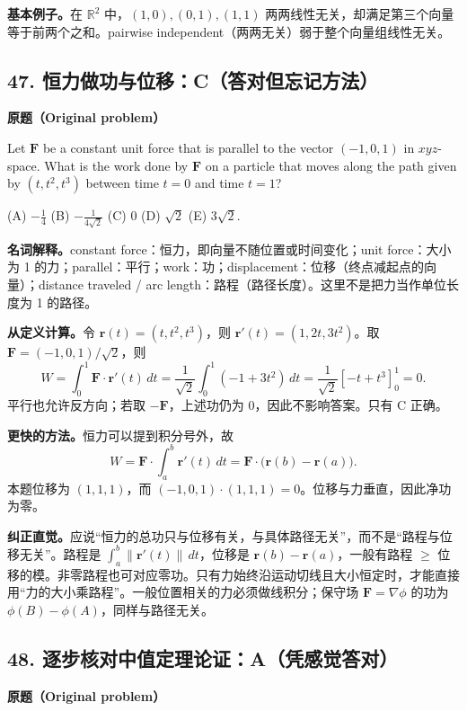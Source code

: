 \documentclass[11pt,a4paper,fontset=fandol]{ctexart}
\begin{document}
\textbf{基本例子。}在 $\mathbb R^2$ 中，$(1,0),(0,1),(1,1)$ 两两线性无关，却满足第三个向量等于前两个之和。pairwise independent（两两无关）弱于整个向量组线性无关。

\subsection{47. 恒力做功与位移：C（答对但忘记方法）}
\label{p2:q47}
\textbf{原题（Original problem）}

Let $\mathbf F$ be a constant unit force that is parallel to the vector $(-1,0,1)$ in $xyz$-space. What is the work done by $\mathbf F$ on a particle that moves along the path given by $(t,t^2,t^3)$ between time $t=0$ and time $t=1$?

(A) $-\frac14$ \quad (B) $-\frac{1}{4\sqrt2}$ \quad (C) $0$ \quad (D) $\sqrt2$ \quad (E) $3\sqrt2$.

\textbf{名词解释。}constant force：恒力，即向量不随位置或时间变化；unit force：大小为 1 的力；parallel：平行；work：功；displacement：位移（终点减起点的向量）；distance traveled / arc length：路程（路径长度）。这里不是把力当作单位长度为 1 的路径。

\textbf{从定义计算。}令 $\mathbf r(t)=(t,t^2,t^3)$，则 $\mathbf r'(t)=(1,2t,3t^2)$。取 $\mathbf F=(-1,0,1)/\sqrt2$，则
\begin{equation}
W=\int_0^1\mathbf F\cdot\mathbf r'(t)\,dt
=\frac1{\sqrt2}\int_0^1(-1+3t^2)\,dt
=\frac1{\sqrt2}[-t+t^3]_0^1=\boxed0.
\label{p2:work-integral}
\end{equation}
平行也允许反方向；若取 $-\mathbf F$，上述功仍为 0，因此不影响答案。只有 C 正确。

\textbf{更快的方法。}恒力可以提到积分号外，故
\begin{equation}
W=\mathbf F\cdot\int_a^b\mathbf r'(t)\,dt
=\mathbf F\cdot\bigl(\mathbf r(b)-\mathbf r(a)\bigr).
\label{p2:constant-force}
\end{equation}
本题位移为 $(1,1,1)$，而 $(-1,0,1)\cdot(1,1,1)=0$。位移与力垂直，因此净功为零。

\textbf{纠正直觉。}应说“恒力的总功只与位移有关，与具体路径无关”，而不是“路程与位移无关”。路程是 $\int_a^b\|\mathbf r'(t)\|\,dt$，位移是 $\mathbf r(b)-\mathbf r(a)$，一般有路程 $\ge$ 位移的模。非零路程也可对应零功。只有力始终沿运动切线且大小恒定时，才能直接用“力的大小乘路程”。一般位置相关的力必须做线积分；保守场 $\mathbf F=\nabla\phi$ 的功为 $\phi(B)-\phi(A)$，同样与路径无关。

\subsection{48. 逐步核对中值定理论证：A（凭感觉答对）}
\label{p2:q48}
\textbf{原题（Original problem）}
\end{document}
